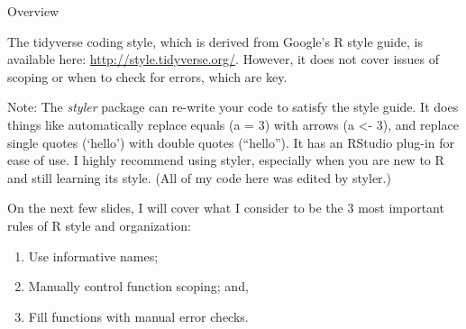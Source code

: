 \documentclass[10pt,ignorenonframetext,]{beamer}
\providecommand{\tightlist}{%
\setlength{\itemsep}{0pt}\setlength{\parskip}{0pt}}
\begin{document}
\begin{frame}{Overview}

The tidyverse coding style, which is derived from Google's R style
guide, is available here: \url{http://style.tidyverse.org/}. However, it
does not cover issues of scoping or when to check for errors, which are
key.

Note: The \emph{styler} package can re-write your code to satisfy the
style guide. It does things like automatically replace equals (a = 3)
with arrows (a \textless{}- 3), and replace single quotes (`hello') with
double quotes (``hello''). It has an RStudio plug-in for ease of use. I
highly recommend using styler, especially when you are new to R and
still learning its style. (All of my code here was edited by styler.)

On the next few slides, I will cover what I consider to be the 3 most
important rules of R style and organization:

\begin{enumerate}
\def\labelenumi{\arabic{enumi}.}
\tightlist
\item
  Use informative names;
\item
  Manually control function scoping; and,
\item
  Fill functions with manual error checks.
\end{enumerate}

\end{frame}
\end{document}
